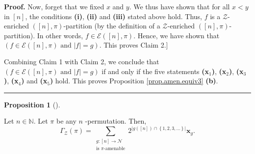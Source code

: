 \documentclass[numbers=enddot,12pt,final,onecolumn,notitlepage]{scrartcl}%
\theoremstyle{definition}
\newtheorem{prop}[theo]{Proposition}
\newenvironment{proposition}[1][]
{\begin{prop}[#1]\begin{leftbar}}
{\end{leftbar}\end{prop}}
\newenvironment{proof}[1][Proof]{\noindent\textbf{#1.} }{\ \rule{0.5em}{0.5em}}
\newenvironment{verlong}{}{}
\let\sumnonlimits\sum
\renewcommand{\sum}{\sumnonlimits\limits}
\begin{document}
\begin{verlong}
\begin{proof}
Now, forget that we fixed $x$ and $y$. We thus have shown that for all $x<y$
in $\left[  n\right]  $, the conditions \textbf{(i)}, \textbf{(ii)} and
\textbf{(iii)} stated above hold. Thus, $f$ is a $\mathcal{Z}$-enriched
$\left(  \left[  n\right]  ,\pi\right)  $-partition (by the definition of a
$\mathcal{Z}$-enriched $\left(  \left[  n\right]  ,\pi\right)  $-partition).
In other words, $f\in\mathcal{E}\left(  \left[  n\right]  ,\pi\right)  $.
Hence, we have shown that $\left(  f\in\mathcal{E}\left(  \left[  n\right]
,\pi\right)  \text{ and }\left\vert f\right\vert =g\right)  $. This proves
Claim 2.]

Combining Claim 1 with Claim 2, we conclude that $\left(  f\in\mathcal{E}%
\left(  \left[  n\right]  ,\pi\right)  \text{ and }\left\vert f\right\vert
=g\right)  $ if and only if the five statements \textbf{(x}$_{1}$\textbf{)},
\textbf{(x}$_{2}$\textbf{)}, \textbf{(x}$_{3}$\textbf{)}, \textbf{(x}$_{4}%
$\textbf{)} and \textbf{(x}$_{5}$\textbf{)} hold. This proves Proposition
\ref{prop.amen.equiv3} \textbf{(b)}.
\end{proof}
\end{verlong}

\begin{proposition}
\label{prop.Epk-formula}Let $n\in\mathbb{N}$. Let $\pi$ be any $n$%
-permutation. Then,%
\[
\Gamma_{\mathcal{Z}}\left(  \pi\right)  =\sum_{\substack{g:\left[  n\right]
\rightarrow\mathcal{N}\\\text{is }\pi\text{-amenable}}}2^{\left\vert g\left(
\left[  n\right]  \right)  \cap\left\{  1,2,3,\ldots\right\}  \right\vert
}\mathbf{x}_{g}.
\]

\end{proposition}
\end{document}
